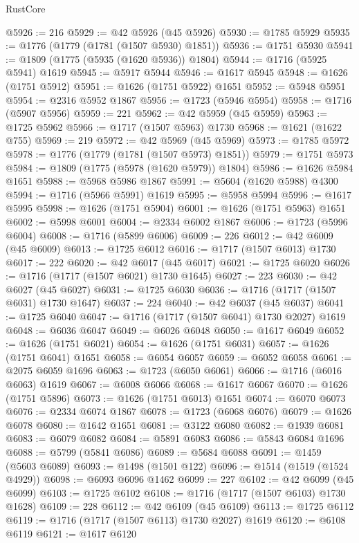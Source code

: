 \begin{lexlean}{RustCore}
\begin{coremodule}
@5926 := 216
@5929 := @42 @5926 (@45 @5926)
@5930 := @1785 @5929
@5935 := @1776 (@1779 (@1781 (@1507 @5930) @1851))
@5936 := @1751 @5930
@5941 := @1809 (@1775 (@5935 (@1620 @5936)) @1804)
@5944 := @1716 (@5925 @5941) @1619
@5945 := @5917 @5944
@5946 := @1617 @5945
@5948 := @1626 (@1751 @5912)
@5951 := @1626 (@1751 @5922) @1651
@5952 := @5948 @5951
@5954 := @2316 @5952 @1867
@5956 := @1723 (@5946 @5954)
@5958 := @1716 (@5907 @5956)
@5959 := 221
@5962 := @42 @5959 (@45 @5959)
@5963 := @1725 @5962
@5966 := @1717 (@1507 @5963) @1730
@5968 := @1621 (@1622 @755)
@5969 := 219
@5972 := @42 @5969 (@45 @5969)
@5973 := @1785 @5972
@5978 := @1776 (@1779 (@1781 (@1507 @5973) @1851))
@5979 := @1751 @5973
@5984 := @1809 (@1775 (@5978 (@1620 @5979)) @1804)
@5986 := @1626 @5984 @1651
@5988 := @5968 @5986 @1867
@5991 := @5604 (@1620 @5988) @4300
@5994 := @1716 (@5966 @5991) @1619
@5995 := @5958 @5994
@5996 := @1617 @5995
@5998 := @1626 (@1751 @5904)
@6001 := @1626 (@1751 @5963) @1651
@6002 := @5998 @6001
@6004 := @2334 @6002 @1867
@6006 := @1723 (@5996 @6004)
@6008 := @1716 (@5899 @6006)
@6009 := 226
@6012 := @42 @6009 (@45 @6009)
@6013 := @1725 @6012
@6016 := @1717 (@1507 @6013) @1730
@6017 := 222
@6020 := @42 @6017 (@45 @6017)
@6021 := @1725 @6020
@6026 := @1716 (@1717 (@1507 @6021) @1730 @1645)
@6027 := 223
@6030 := @42 @6027 (@45 @6027)
@6031 := @1725 @6030
@6036 := @1716 (@1717 (@1507 @6031) @1730 @1647)
@6037 := 224
@6040 := @42 @6037 (@45 @6037)
@6041 := @1725 @6040
@6047 := @1716 (@1717 (@1507 @6041) @1730 @2027) @1619
@6048 := @6036 @6047
@6049 := @6026 @6048
@6050 := @1617 @6049
@6052 := @1626 (@1751 @6021)
@6054 := @1626 (@1751 @6031)
@6057 := @1626 (@1751 @6041) @1651
@6058 := @6054 @6057
@6059 := @6052 @6058
@6061 := @2075 @6059 @1696
@6063 := @1723 (@6050 @6061)
@6066 := @1716 (@6016 @6063) @1619
@6067 := @6008 @6066
@6068 := @1617 @6067
@6070 := @1626 (@1751 @5896)
@6073 := @1626 (@1751 @6013) @1651
@6074 := @6070 @6073
@6076 := @2334 @6074 @1867
@6078 := @1723 (@6068 @6076)
@6079 := @1626 @6078
@6080 := @1642 @1651
@6081 := @3122 @6080
@6082 := @1939 @6081
@6083 := @6079 @6082
@6084 := @5891 @6083
@6086 := @5843 @6084 @1696
@6088 := @5799 (@5841 @6086)
@6089 := @5684 @6088
@6091 := @1459 (@5603 @6089)
@6093 := @1498 (@1501 @122)
@6096 := @1514 (@1519 (@1524 @4929))
@6098 := @6093 @6096 @1462
@6099 := 227
@6102 := @42 @6099 (@45 @6099)
@6103 := @1725 @6102
@6108 := @1716 (@1717 (@1507 @6103) @1730 @1628)
@6109 := 228
@6112 := @42 @6109 (@45 @6109)
@6113 := @1725 @6112
@6119 := @1716 (@1717 (@1507 @6113) @1730 @2027) @1619
@6120 := @6108 @6119
@6121 := @1617 @6120

\end{coremodule}
\end{lexlean}
